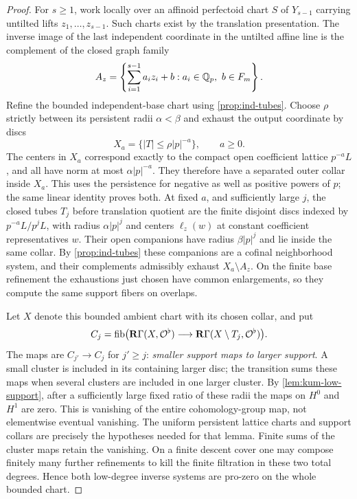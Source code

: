 \begin{proof}
For $s\geq1$, work locally over an affinoid perfectoid
chart $S$ of $Y_{s-1}$ carrying untilted lifts
$z_1,\ldots,z_{s-1}$.  Such charts exist by the
translation presentation.  The inverse image of the last
independent coordinate in the untilted affine line is
the complement of the closed graph family
\[
 A_z=\left\{\sum_{i=1}^{s-1}a_i z_i+b:
           a_i\in\mathbb Q_p,\ b\in F_m\right\}.
\]
Refine the bounded independent-base chart using
\cref{prop:ind-tubes}.  Choose $\rho$ strictly between its
persistent radii $\alpha<\beta$ and exhaust the output
coordinate by discs
\[
 X_a=\{|T|\leq\rho|p|^{-a}\},\qquad a\geq0.
\]
The centers in $X_a$ correspond exactly to the compact open
coefficient lattice $p^{-a}L$, and all have norm at most
$\alpha|p|^{-a}$.  They therefore have a separated outer
collar inside $X_a$.  This uses the persistence for negative
as well as positive powers of $p$; the same linear identity
proves both.  At fixed $a$, and sufficiently large $j$, the
closed tubes $T_j$ before translation quotient are the finite
disjoint discs indexed by $p^{-a}L/p^jL$, with radius
$\alpha|p|^j$ and centers $\ell_z(w)$ at constant coefficient
representatives $w$.  Their open companions have radius
$\beta|p|^j$ and lie inside the same collar.  By
\cref{prop:ind-tubes} these companions are a cofinal
neighborhood system, and their complements admissibly exhaust
$X_a\setminus A_z$.  On the finite base refinement the
exhaustions just chosen have common enlargements, so they
compute the same support fibers on overlaps.

Let $X$ denote this bounded ambient chart with its
chosen collar, and put
\[
 C_j=\operatorname{fib}\bigl(
       \mathbf R\Gamma(X,\mathcal O^\flat)
        \longrightarrow
       \mathbf R\Gamma(X\setminus T_j,\mathcal O^\flat)\bigr).
\]
The maps are $C_{j'}\to C_j$ for $j'\geq j$:
\emph{smaller support maps to larger support}.  A small
cluster is included in its containing larger disc;
the transition sums these maps when several clusters
are included in one larger cluster.  By
\cref{lem:kum-low-support}, after a sufficiently large
fixed ratio of these radii the maps on $H^0$ and
$H^1$ are zero.  This is vanishing of the entire
cohomology-group map, not elementwise eventual
vanishing.  The uniform persistent lattice charts
and support collars are precisely the hypotheses
needed for that lemma.  Finite sums of the cluster
maps retain the vanishing.  On a finite descent
cover one may compose finitely many further
refinements to kill the finite filtration in these
two total degrees.  Hence both low-degree inverse
systems are pro-zero on the whole bounded chart.


\end{proof}

